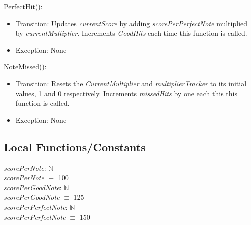 \documentclass[12pt]{article}
\begin{document}
\noindent PerfectHit():
\begin{itemize}
    \item Transition: Updates \textit{currentScore} by adding \textit{scorePerPerfectNote} multiplied by \textit{currentMultiplier}. Increments \textit{GoodHits} each time this function is called.
    \item Exception: None
\end{itemize}

\noindent NoteMissed():
\begin{itemize}
    \item Transition: Resets the \textit{CurrentMultiplier} and \textit{multiplierTracker} to its initial values, 1 and 0 respectively. Increments \textit{missedHits} by one each this this function is called. 
    \item Exception: None
\end{itemize}

\subsection{Local Functions/Constants}
\textit{scorePerNote}: $\mathbb{N} $ \\
\textit{scorePerNote} $\equiv$ 100\\

\noindent \textit{scorePerGoodNote}: $\mathbb{N} $ \\
\textit{scorePerGoodNote} $\equiv$ 125\\

\noindent \textit{scorePerPerfectNote}: $\mathbb{N} $ \\
\textit{scorePerPerfectNote} $\equiv$ 150\\
\medskip
\end{document}
